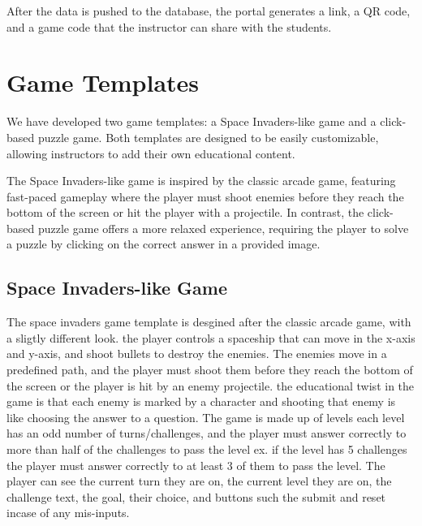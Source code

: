 After the data is pushed to the database, the portal generates a link, a QR code, and a game code that the instructor can share with the students.

\section{Game Templates}

We have developed two game templates: a Space Invaders-like game and a click-based puzzle game. Both templates are designed to be easily customizable, allowing instructors to add their own educational content.

The Space Invaders-like game is inspired by the classic arcade game, featuring fast-paced gameplay where the player must shoot enemies before they reach the bottom of the screen or hit the player with a projectile. In contrast, the click-based puzzle game offers a more relaxed experience, requiring the player to solve a puzzle by clicking on the correct answer in a provided image.

\subsection{Space Invaders-like Game}
The space invaders game template is desgined after the classic arcade game, with a sligtly different look. the player controls a spaceship that can move in the x-axis and y-axis, and shoot bullets to destroy the enemies. The enemies move in a predefined path, and the player must shoot them before they reach the bottom of the screen or the player is hit by an enemy projectile.
the educational twist in the game is that each enemy is marked by a character and shooting that enemy is like choosing the answer to a question. The game is made up of levels each level has an odd number of turns/challenges, and the player must answer correctly to more than half of the challenges to pass the level 
ex. if the level has 5 challenges the player must answer correctly to at least 3 of them to pass the level. 
The player can see the current turn they are on, the current level they are on, the challenge text, the goal,
their choice, and buttons such the submit and reset incase of any mis-inputs.

